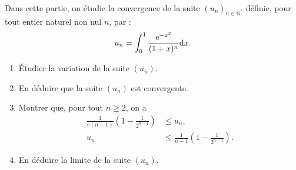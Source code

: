 \begin{exo}
\begin{description}
\begin{enumerate}
      \end{enumerate}
      \item[Partie B :]
      Dans cette partie, 
      on \'etudie la convergence de la suite $(u_n)_{n \in \mathbb{N}^*}$ d\'efinie, pour tout entier naturel non nul $n$, par : 
      \[ 
        u_n = \int_0^1 \frac{\mathrm{e}^{-x^2}}{(1 + x)^n} \mathrm{d}x.
      \]
      \begin{enumerate}
      \item \'Etudier la variation de la suite $(u_n)$.
      \item En d\'eduire que la suite $(u_n)$ est convergente.     
      \item Montrer que, pour tout $n \geq 2$, on a
            \[
              \begin{aligned}
                \frac{1}{e(n-1)}\left(1-\frac{1}{2^{n-1}}\right)
                &\leq u_n, \\
                u_n
                &\leq \frac{1}{n-1}\left(1-\frac{1}{2^{n-1}}\right).
              \end{aligned}
            \]
      \item En d\'eduire la limite de la suite $(u_n)$.      
      \end{enumerate}
      \end{description}
\end{exo}
